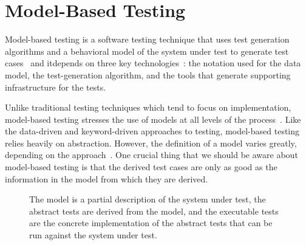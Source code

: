 \section{Model-Based Testing}

Model-based testing is a software testing technique that uses test generation algorithms and a behavioral model of the system under test to generate test cases~\cite{1200168} and itdepends on three
key technologies~\cite{Dalal1999}: the notation used for the data model,
the test-generation algorithm, and the tools that generate supporting
infrastructure for the tests.

Unlike traditional testing techniques which tend to focus on implementation,
model-based testing stresses the use of models at all levels of the process~\cite{5381477}.
Like the data-driven and keyword-driven approaches to testing, model-based
testing relies heavily on abstraction. However, the definition of a model varies
greatly, depending on the approach~\cite{Jääskeläinen2008}. One crucial thing
that we should be aware about model-based testing is that the derived test cases
are only as good as the information in the model from which they are derived.

\begin{figure}[!ht]
\centering
{}
\caption{The model is a partial description of the system under test, the abstract tests are derived from the model, and the executable tests are the concrete implementation of the abstract tests that can be run against the system under test.} \label{fig:f3}
\end{figure}

